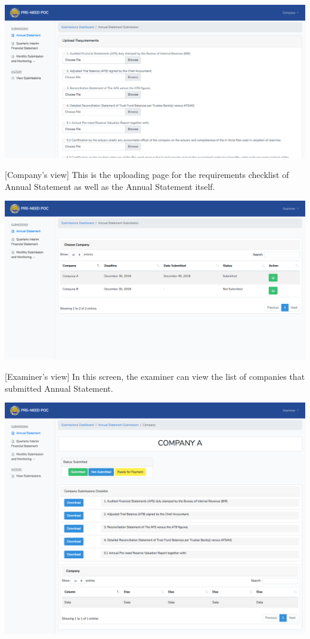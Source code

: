 \documentclass{article}
\begin{document}
\noindent{}\includegraphics[keepaspectratio=true]{up-ic-screens/image72}{}%

[Company’s view] This is the uploading page for the
requirements checklist of Annual Statement as well as the Annual
Statement itself.%

\includegraphics[keepaspectratio=true]{up-ic-screens/image195}{}%

[Examiner’s view] In this screen, the examiner can
view the list of companies that submitted Annual Statement.%

\includegraphics[keepaspectratio=true]{up-ic-screens/image122}{}%
\end{document}
